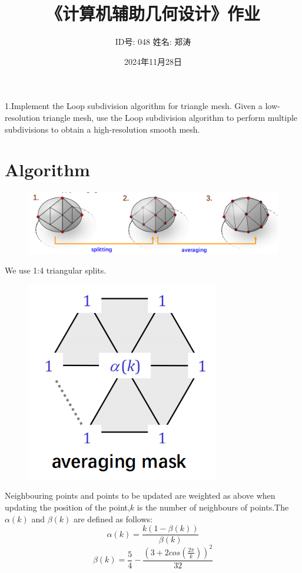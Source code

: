 \documentclass{article}
\begin{document}
	
	\title{《计算机辅助几何设计》作业}
	\author{ID号: 048  \qquad  姓名: 郑涛}  %
	\date{2024年11月28日}
	\maketitle
	1.Implement the Loop subdivision algorithm for triangle mesh. Given a low-resolution
	triangle mesh, use the Loop subdivision algorithm to perform multiple subdivisions to obtain a high-resolution smooth mesh.
	\section{Algorithm}
	\begin{figure}[H]
		\centering
		\includegraphics[scale=0.7]{"split"}
		\caption{}
		\label{fig:split}
	\end{figure}
We use 1:4 triangular splits.
	\begin{figure}[H]
		\centering
		\includegraphics[scale=0.7]{"averaging mask"}
		\caption{}
		\label{fig:averaging-mask}
	\end{figure}
	Neighbouring points and points to be updated are weighted as above when updating the position of the point,$k$ is the number of neighbours of points.The $\alpha(k)$ and $\beta(k)$ are defined as follows:
	$$\alpha(k)=\frac{k(1-\beta(k))}{\beta(k)}$$
	$$\beta(k)=\frac{5}{4}-\frac{(3+2cos(\frac{2\pi}{k}))^2}{32}$$
	
\end{document}
